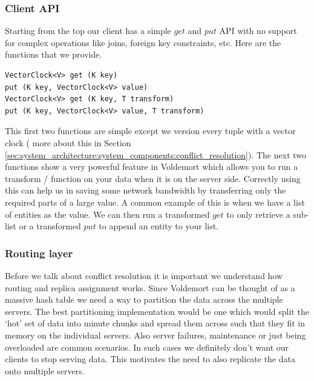 \documentclass[10pt,twocolumn,preprint,natbib,authoryear]{sigplanconf}
\begin{document}
\subsubsection {Client API }  
\label{sec:system_architecture:system_components:client_api}

Starting from the top our client has a simple $get$ and $put$ API with no support for complex operations like joins, foreign key constraints, etc. Here are the functions that we provide. 

\scriptsize
\begin{verbatim}
VectorClock<V> get (K key)
put (K key, VectorClock<V> value)
VectorClock<V> get (K key, T transform)
put (K key, VectorClock<V> value, T transform)
\end{verbatim}
\normalsize

This first two functions are simple except we version every tuple with a vector clock ( more about this in Section \ref{sec:system_architecture:system_components:conflict_resolution}). The next two functions show a very powerful feature in Voldemort which allows you to run a transform / function on your data when it is on the server side. Correctly using this can help us in saving some network bandwidth by transferring only the required parts of a large value. A common example of this is when we have a list of entities as the value. We can then run a transformed $get$ to only retrieve a sub-list or a transformed $put$ to append an entity to your list. 


\subsubsection {Routing layer }  
\label{sec:system_architecture:system_components:routing_layer}

Before we talk about conflict resolution it is important we understand how routing and replica assignment works. Since Voldemort can be thought of as a massive hash table we need a way to partition the data across the multiple servers. The best partitioning implementation would be one which would split the `hot' set of data into minute chunks and spread them across such that they fit in memory on the individual servers. Also server failures, maintenance or just being overloaded are common scenarios. In such cases we definitely don't want our clients to stop serving data. This motivates the need to also replicate the data onto multiple servers. 
\end{document}
